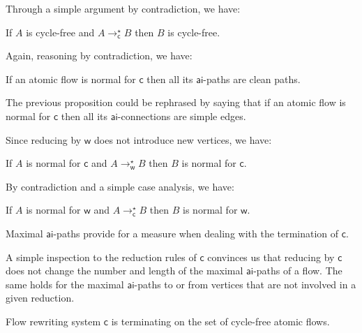 \documentclass[a4paper]{LMCS}
\begin{document}
Through a simple argument by contradiction, we have:

\begin{prop}\label{PropCLF}
If $A$ is cycle-free and $A\to_{{\mathsf c}}^\star B$ then $B$ is cycle-free.
\end{prop}

Again, reasoning by contradiction, we have:

\begin{prop}\label{PropCOW}
If an atomic flow is normal for\/ ${{\mathsf c}}$ then all its\/ ${\mathsf{ai}}$-paths are clean paths.
\end{prop}

The previous proposition could be rephrased by saying that if an atomic flow is normal for ${{\mathsf c}}$ then all its ${\mathsf{ai}}$-connections are simple edges.

Since reducing by ${{\mathsf w}}$ does not introduce new vertices, we have:

\begin{prop}\label{PropWC}
If $A$ is normal for\/ ${{\mathsf c}}$ and $A\to_{{\mathsf w}}^\star B$ then $B$ is normal for\/ ${{\mathsf c}}$.
\end{prop}

By contradiction and a simple case analysis, we have:

\begin{prop}\label{PropCW}
If $A$ is normal for\/ ${{\mathsf w}}$ and $A\to_{{\mathsf c}}^\star B$ then $B$ is normal for\/ ${{\mathsf w}}$.
\end{prop}

Maximal ${\mathsf{ai}}$-paths provide for a measure when dealing with the termination of ${{\mathsf c}}$.

\begin{rem}\label{RemRank}
A simple inspection to the reduction rules of ${{\mathsf c}}$ convinces us that reducing by ${{\mathsf c}}$ does not change the number and length of the maximal ${\mathsf{ai}}$-paths of a flow. The same holds for the maximal ${\mathsf{ai}}$-paths to or from vertices that are not involved in a given reduction.
\end{rem}

\begin{thm}\label{TheoCTerm}
Flow rewriting system\/ ${{\mathsf c}}$ is terminating on the set of cycle-free atomic flows.
\end{thm}
\end{document}
